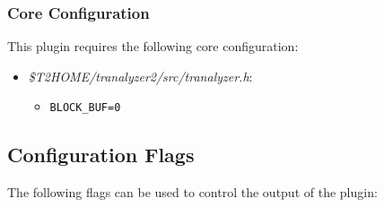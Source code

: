 \documentclass[documentation]{subfiles}
\begin{document}
\subsubsection{Core Configuration}
This plugin requires the following core configuration:
\begin{itemize}
    \item {\em \$T2HOME/tranalyzer2/src/tranalyzer.h}:
        \begin{itemize}
            \item {\tt BLOCK\_BUF=0}
        \end{itemize}
\end{itemize}

\subsection{Configuration Flags}

The following flags can be used to control the output of the plugin:
\end{document}
